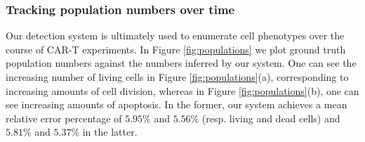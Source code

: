 
%

\subsubsection{Tracking population numbers over time}
\label{subsubsec:tracking}
Our detection system is ultimately used to enumerate cell phenotypes over the course of CAR-T experiments. In Figure \ref{fig:populations} we plot ground truth population numbers against the numbers inferred by our system. One can see the increasing number of living cells in Figure \ref{fig:populations}(a), corresponding to increasing amounts of cell division, whereas in Figure \ref{fig:populations}(b), one can see increasing amounts of apoptosis. In the former, our system achieves a mean relative error percentage of $5.95\%$ and $5.56\%$ (resp. living and dead cells) and $5.81\%$ and $5.37\%$ in the latter.

